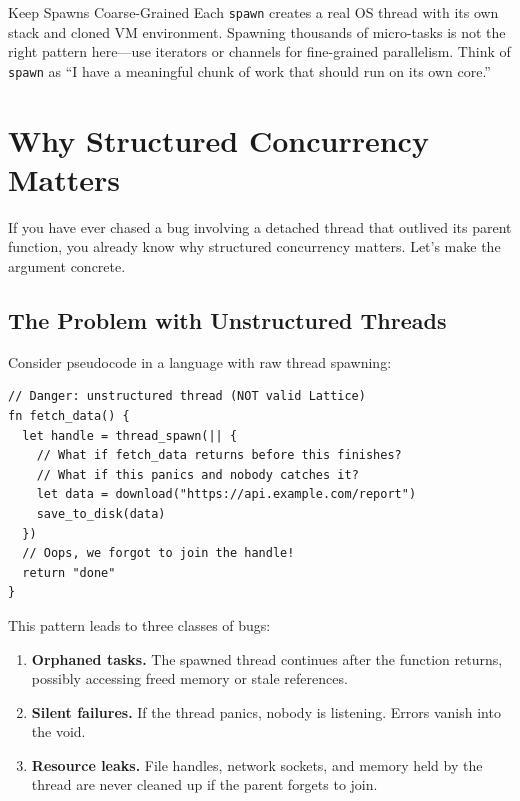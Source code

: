 \begin{tipbox}{Keep Spawns Coarse-Grained}
Each \lstinline|spawn| creates a real OS thread with its own stack and cloned VM environment.
Spawning thousands of micro-tasks is not the right pattern here---use iterators or channels for fine-grained parallelism.
Think of \lstinline|spawn| as ``I have a meaningful chunk of work that should run on its own core.''
\end{tipbox}

\section{Why Structured Concurrency Matters}\label{sec:why-structured-concurrency}


If you have ever chased a bug involving a detached thread that outlived its parent function, you already know why structured concurrency matters.
Let's make the argument concrete.

\subsection{The Problem with Unstructured Threads}

Consider pseudocode in a language with raw thread spawning:

\begin{lstlisting}[language=Lattice, caption={An unstructured concurrency hazard (pseudocode)}]
// Danger: unstructured thread (NOT valid Lattice)
fn fetch_data() {
  let handle = thread_spawn(|| {
    // What if fetch_data returns before this finishes?
    // What if this panics and nobody catches it?
    let data = download("https://api.example.com/report")
    save_to_disk(data)
  })
  // Oops, we forgot to join the handle!
  return "done"
}
\end{lstlisting}

This pattern leads to three classes of bugs:

\begin{enumerate}
  \item \textbf{Orphaned tasks.} The spawned thread continues after the function returns, possibly accessing freed memory or stale references.
  \item \textbf{Silent failures.} If the thread panics, nobody is listening. Errors vanish into the void.
  \item \textbf{Resource leaks.} File handles, network sockets, and memory held by the thread are never cleaned up if the parent forgets to join.
\end{enumerate}

